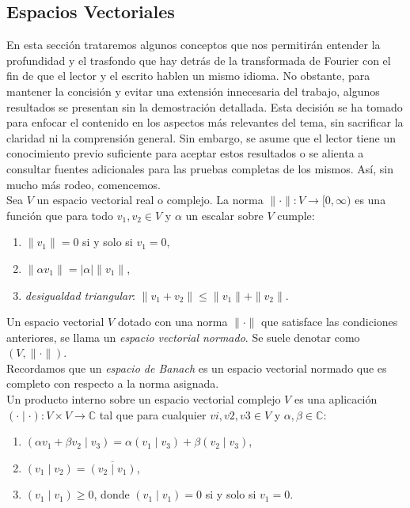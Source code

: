   \subsection{Espacios Vectoriales}\label{subsec:espacios-vectoriales}
    En esta sección trataremos algunos conceptos que nos permitirán entender la profundidad y el trasfondo que hay detrás de la transformada de Fourier con el fin de que el lector y el escrito hablen un mismo idioma. No obstante, para mantener la concisión y evitar una extensión innecesaria del trabajo, algunos resultados se presentan sin la demostración detallada. Esta decisión se ha tomado para enfocar el contenido en los aspectos más relevantes del tema, sin sacrificar la claridad ni la comprensión general. Sin embargo, se asume que el lector tiene un conocimiento previo suficiente para aceptar estos resultados o se alienta a consultar fuentes adicionales para las pruebas completas de los mismos. Así, sin mucho más rodeo, comencemos.\\
    Sea $V$ un espacio vectorial real o complejo. La norma $\|\cdot\|:V\rightarrow [0,\infty)$ es una función que para todo $v_1,v_2\in V$ y $\alpha$ un escalar sobre $V$ cumple:
    \begin{enumerate}
      \item $\|v_1\|=0$ si y solo si $v_1=0$,
      \item $\|\alpha v_1\|=|\alpha|\|v_1\|$,
      \item \textit{desigualdad triangular}: $\|v_1+v_2\|\leq \|v_1\|+\|v_2\|$.
    \end{enumerate}
    Un espacio vectorial $V$ dotado con una norma $\|\cdot\|$ que satisface las condiciones anteriores, se llama un \textit{espacio vectorial normado}. Se suele denotar como $(V,\|\cdot\|)$.\\
    Recordamos que un \textit{espacio de Banach} es un espacio vectorial normado que es completo con respecto a la norma asignada.\\
    Un producto interno sobre un espacio vectorial complejo $V$ es una aplicación $(\cdot\mid\cdot):V\times V\rightarrow \mathbb{C}$ tal que para cualquier $vi,v2,v3 \in V$ y $\alpha,\beta \in \mathbb{C}$:
    \begin{enumerate}
      \item $(\alpha v_1+\beta v_2\mid v_3)=\alpha(v_1\mid v_3)+\beta(v_2\mid v_3)$,
      \item $(v_1\mid v_2)=\overline{(v_2\mid v_1)}$,
      \item $(v_1\mid v_1)\geq 0$, donde $(v_1\mid v_1)=0$ si y solo si $v_1=0$.
    \end{enumerate}

